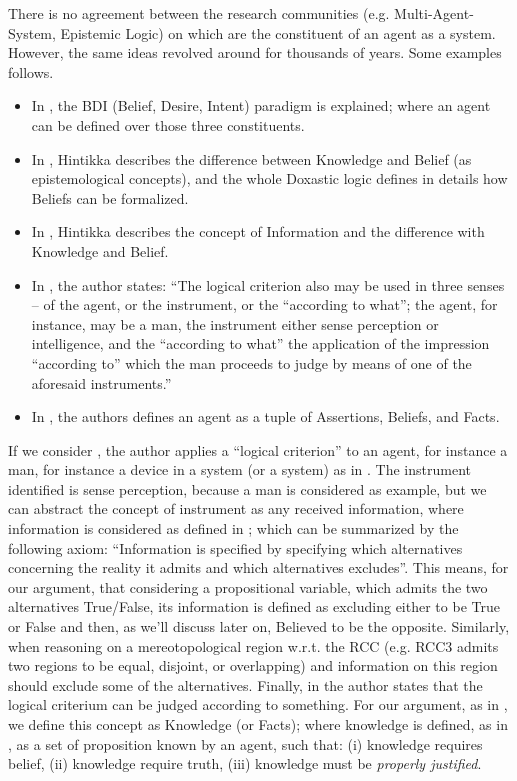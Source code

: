 There is no agreement between the research communities (e.g.
Multi-Agent-System, Epistemic Logic) on which are the constituent of an agent
as a system. However, the same ideas revolved around for thousands of years.
Some examples follows.
\begin{itemize}
	\item In \autocite{Georgeoff1995bdi}, the BDI (Belief, Desire, Intent)
		paradigm is explained; where an agent can be defined over those
		three constituents.
	\item In \autocite{Hintikka1962knowledge}, Hintikka describes the
		difference between Knowledge and Belief (as epistemological
		concepts), and the whole Doxastic logic defines in details how
		Beliefs can be formalized.
	\item In \autocite{Hintikka1993Information}, Hintikka describes the concept
		of Information and the difference with Knowledge and Belief.
	\item In \autocite{Empiricus1990Pyrrhonism}, the author states: ``The
		logical criterion also may be used in three senses -- of the
		agent, or the instrument, or the ``according to what''; the
		agent, for instance, may be a man, the instrument either sense
		perception or intelligence, and the ``according to what'' the
		application of the impression ``according to'' which the man
		proceeds to judge by means of one of the aforesaid
		instruments.'' 
	\item In \autocite{Santaca2016abf}, the authors defines an agent as a
		tuple of Assertions, Beliefs, and Facts.
\end{itemize}

If we consider \autocite{Empiricus1990Pyrrhonism}, the author applies a
``logical criterion'' to an agent, for instance a man, for instance a device in
a system (or a system) as in \autocite{Santaca2016abf}.  The instrument identified is sense
perception, because a man is considered as example, but we can abstract the
concept of instrument as any received information, where information is
considered as defined in \autocite{Hintikka1993Information}; which can be
summarized by the following axiom: ``Information is specified by specifying
which alternatives concerning the reality it admits and which alternatives
excludes''. This means, for our argument, that considering a propositional
variable, which admits the two alternatives True/False, its information is
defined as excluding either to be True or False and then, as we'll discuss
later on, Believed to be the opposite. Similarly, when reasoning on a
mereotopological region w.r.t. the RCC (e.g. RCC3 admits two regions to be
equal, disjoint, or overlapping) and information on this region should exclude
some of the alternatives. Finally, in \autocite{Empiricus1990Pyrrhonism}
the author states that the logical criterium can be judged according to something.
For our argument, as in \autocite{Santaca2016abf}, we define this concept
as Knowledge (or Facts); where knowledge is defined, as in \autocite{Steup2020epistemology}, as
a set of proposition known by an agent, such that: (i) knowledge requires belief,
(ii) knowledge require truth, (iii) knowledge must be \emph{properly justified}.

